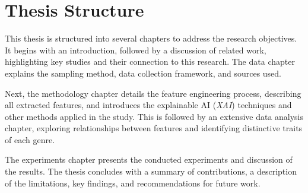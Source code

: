 

\section{Thesis Structure}
\label{sec:thesisstructure}

This thesis is structured into several chapters to address the research
objectives. It begins with an introduction, followed by a discussion of related
work, highlighting key studies and their connection to this research. The data
chapter explains the sampling method, data collection framework, and sources
used.

Next, the methodology chapter details the feature engineering process,
describing all extracted features, and introduces the explainable AI
(\textit{XAI}) techniques and other methods applied in the study. This is
followed by an extensive data analysis chapter, exploring relationships between
features and identifying distinctive traits of each genre.

The experiments chapter presents the conducted experiments and discussion of
the results. The thesis concludes with a summary of contributions, a description
of the limitations, key findings, and recommendations for future work. 

